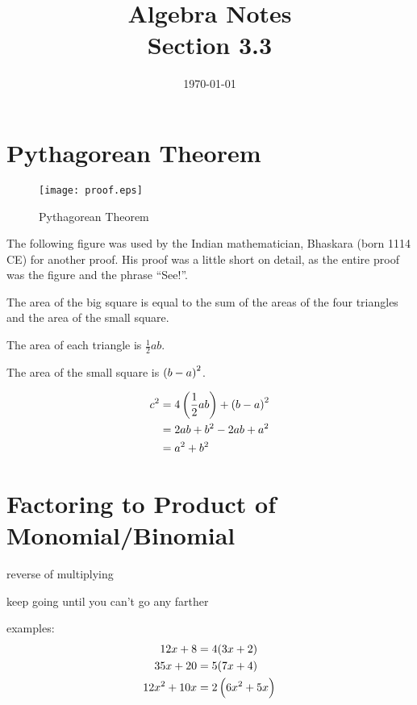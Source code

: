 \documentclass[letterpaper, landscape]{exam}
\title{Algebra Notes \\ Section 3.3 }
\author{}
\date{\today}
\begin{document}
  \maketitle

  \section{Pythagorean Theorem} %

  \begin{figure}[H]
    \centering
    \texttt{[image: proof.eps]}
    \caption{Pythagorean Theorem}
  \end{figure}
  
  The following figure was used by the Indian mathematician, Bhaskara (born 1114 CE) for another
  proof.  His proof was a little short on detail, as the entire proof was the figure and the phrase
  ``See!''.  

  The area of the big square is equal to the sum of the areas of the four triangles and the area
  of the small square.

  \begin{itemize*} 
    \item The area of each triangle is $\frac{1}{2} ab $.
    \item The area of the small square is $\del{ b - a }^2$.  
  \end{itemize*}

  \begin{align*} 
    c^2 & = 4 \del{ \frac{1}{2} ab } + \del{ b - a }^2 \\
        & = 2ab + b^2 - 2ab + a^2 \\
        & = a^2 + b^2 \\
  \end{align*}

  \section{Factoring to Product of Monomial/Binomial}

  \begin{itemize*}
    \item reverse of multiplying
    \item keep going until you can't go any farther
  \end{itemize*}

  examples:
  \begin{align*}
    12x + 8     & = 4(3x + 2) \\
    35x + 20    & = 5(7x + 4) \\
    12x^2 + 10x & = 2 \del{ 6x^2 + 5x }
  \end{align*}
\end{document}
